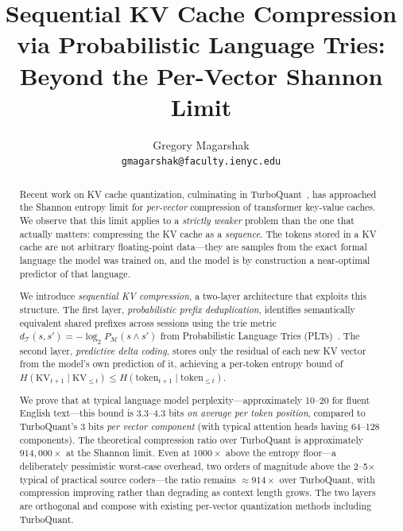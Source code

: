 \documentclass[11pt]{article}
\title{Sequential KV Cache Compression\\via Probabilistic Language Tries:\\
Beyond the Per-Vector Shannon Limit}
\author{Gregory Magarshak\\
\texttt{gmagarshak@faculty.ienyc.edu}}
\date{}
\begin{document}
\maketitle

\begin{abstract}
  Recent work on KV cache quantization, culminating in TurboQuant~\cite{turbo2026},
  has approached the Shannon entropy limit for \emph{per-vector} compression of
  transformer key-value caches.  We observe that this limit applies to a
  \emph{strictly weaker} problem than the one that actually matters: compressing
  the KV cache as a \emph{sequence}.  The tokens stored in a KV cache are not
  arbitrary floating-point data---they are samples from the exact formal language
  the model was trained on, and the model is by construction a near-optimal
  predictor of that language.

  We introduce \emph{sequential KV compression}, a two-layer architecture that
  exploits this structure.  The first layer, \emph{probabilistic prefix
  deduplication}, identifies semantically equivalent shared prefixes across
  sessions using the trie metric $d_{\mathcal{T}}(s,s') = {-}\log_2 P_{\mathcal{M}}(s \wedge s')$
  from Probabilistic Language Tries (PLTs)~\cite{plt2026}.  The second layer,
  \emph{predictive delta coding}, stores only the residual of each new KV vector
  from the model's own prediction of it, achieving a per-token entropy bound of
  $H(\mathrm{KV}_{t+1} \mid \mathrm{KV}_{\leq t}) \leq H(\mathrm{token}_{t+1} \mid \mathrm{token}_{\leq t})$.

  We prove that at typical language model perplexity---approximately 10--20 for
  fluent English text---this bound is 3.3--4.3 bits \emph{on average per token position},
  compared to TurboQuant's 3 bits \emph{per vector component} (with typical
  attention heads having 64--128 components).  The theoretical compression ratio over TurboQuant is
  approximately $914{,}000\times$ at the Shannon limit.  Even at $1000\times$ above
  the entropy floor---a deliberately pessimistic worst-case overhead, two orders
  of magnitude above the 2--5$\times$ typical of practical source coders---the
  ratio remains $\approx 914\times$ over TurboQuant, with compression improving
  rather than degrading as context length grows.  The two layers are orthogonal and compose with
  existing per-vector quantization methods including TurboQuant.
\end{abstract}

\tableofcontents
\newpage
\end{document}

